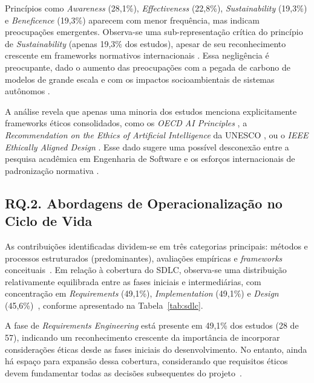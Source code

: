 Princípios como \textit{Awareness} (28,1\%), \textit{Effectiveness} (22,8\%), \textit{Sustainability} (19,3\%) e \textit{Beneficence} (19,3\%) aparecem com menor frequência, mas indicam preocupações emergentes. Observa-se uma sub-representação crítica do princípio de \textit{Sustainability} (apenas 19,3\% dos estudos), apesar de seu reconhecimento crescente em frameworks normativos internacionais \cite{UNESCO2021, EUAIAct2024}. Essa negligência é preocupante, dado o aumento das preocupações com a pegada de carbono de modelos de grande escala \cite{Bender2021, Patterson2021} e com os impactos socioambientais de sistemas autônomos \cite{Crawford2021, Luccioni2023}.

A análise revela que apenas uma minoria dos estudos menciona explicitamente frameworks éticos consolidados, como os \textit{OECD AI Principles} \cite{OECD2019}, a \textit{Recommendation on the Ethics of Artificial Intelligence} da UNESCO \cite{UNESCO2021}, ou o \textit{IEEE Ethically Aligned Design} \cite{IEEE2019}. Esse dado sugere uma possível desconexão entre a pesquisa acadêmica em Engenharia de Software e os esforços internacionais de padronização normativa \cite{Floridi2018, Jobin2019}.


\subsection{RQ.2. Abordagens de Operacionalização no Ciclo de Vida}

As contribuições identificadas dividem-se em três categorias principais: métodos e processos estruturados (predominantes), avaliações empíricas e \textit{frameworks} conceituais~\cite{Morley2020, McNamara2018}. Em relação à cobertura do SDLC, observa-se uma distribuição relativamente equilibrada entre as fases iniciais e intermediárias, com concentração em \textit{Requirements} (49,1\%), \textit{Implementation} (49,1\%) e \textit{Design} (45,6\%)~\cite{Bellamy2019, Breck2017}, conforme apresentado na Tabela~\ref{tab:sdlc}.

A fase de \textit{Requirements Engineering} está presente em 49,1\% dos estudos (28 de 57), indicando um reconhecimento crescente da importância de incorporar considerações éticas desde as fases iniciais do desenvolvimento. No entanto, ainda há espaço para expansão dessa cobertura, considerando que requisitos éticos devem fundamentar todas as decisões subsequentes do projeto~\cite{Friedman2013, Umbrello2020}.

